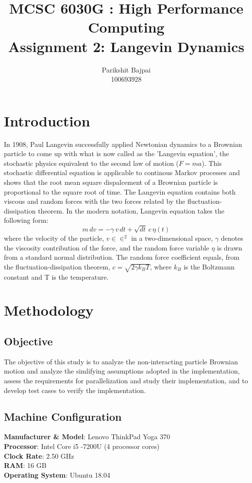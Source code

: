 \documentclass[11pt, oneside]{article}
\title{MCSC 6030G : High Performance Computing \\ Assignment 2: Langevin Dynamics}
\author{Parikshit Bajpai \\ 100693928}
\date{}							%
\begin{document}
\maketitle

\section{Introduction}
In 1908, Paul Langevin successfully applied Newtonian dynamics to a Brownian particle to come up with what is now called as the 'Langevin equation', the stochastic physics equivalent to the second law of motion (\(F=ma\)). This stochastic differential equation is applicable to continous Markov processes and shows that the root mean square dispalcement of a Brownian particle is proportional to the square root of time. The Langevin equation contains both viscous and random forces with the two forces related by the  fluctuation-dissipation theorem. In the modern notation, Langevin equation takes the following form:     
  \begin{equation} \label{Langevin}
    m\,dv = - \gamma\,v\,dt + \sqrt{dt}\,c\,\eta(t) 
  \end{equation}
where the velocity of the particle, \(v \in \in^2\) in a two-dimensional space, \(\gamma\)  denotes the viscosity contribution of the force, and the random force variable \(\eta\) is drawn from a standard normal distribution. The random force  coefficient equals, from the fluctuation-dissipation theorem, \(c = \sqrt{2 \gamma k_B T}\), where \(k_B\) is the Boltzmann constant and T is the temperature.  

\section{Methodology}
\subsection{Objective}
The objective of this study is to analyze the non-interacting particle Brownian motion and analyze the simlifying assumptions adopted in the implementation, assess the requirements for parallelization and study their implementation, and to develop test cases to verify the implementation. 

\subsection{Machine Configuration}
	\textbf{Manufacturer \& Model}: Lenovo ThinkPad Yoga 370\\
	\textbf{Processor}: Intel Core i5 -7200U (4 processor cores)\\
	\textbf{Clock Rate}:  2.50 GHz\\
	\textbf{RAM}:  16 GB\\
	\textbf{Operating System}: Ubuntu 18.04\\
	
\end{document}
